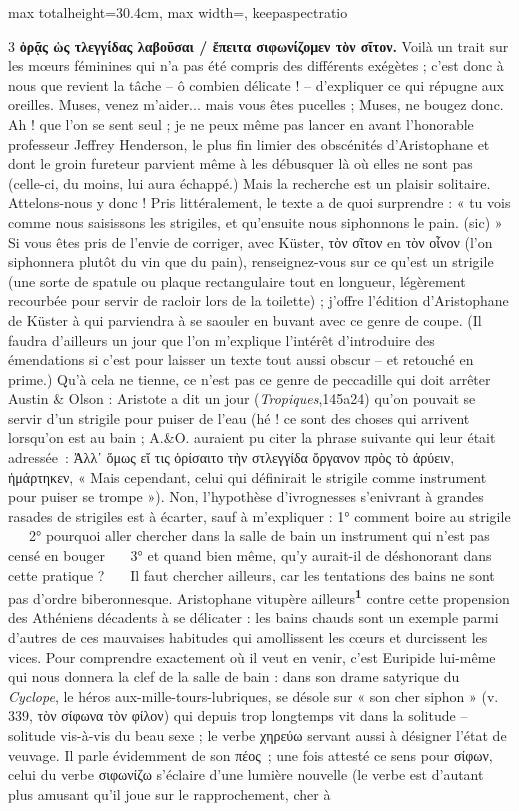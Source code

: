 \documentclass[11pt,twoside]{book}
\newcommand{\italique}[1]{\textit{#1}}
\newcommand{\marqueur}[1]{\textsuperscript{\color{rubricRed}\textbf{#1}}}
\begin{document}
\begin{adjustbox}{max totalheight=30.4cm, max width=\textwidth, keepaspectratio}
\begin{minipage}{\textwidth}
{\begin{multicols}{3}
 \textbf{ὁρᾷς ὡς τλεγγίδας λαβοῦσαι / ἔπειτα σιφωνίζομεν τὸν σῖτον.} Voilà un trait sur les mœurs féminines qui n'a pas été compris des différents exégètes ; c'est donc à nous que revient la tâche – ô combien délicate ! – d'expliquer ce qui répugne aux oreilles. Muses, venez m'aider... mais vous êtes pucelles ; Muses, ne bougez donc. Ah ! que l'on se sent seul ; je ne peux même pas lancer en avant l'honorable professeur Jeffrey Henderson, le plus fin limier des obscénités d'Aristophane et dont le groin fureteur parvient même à les débusquer là où elles ne sont pas (celle-ci, du moins, lui aura échappé.) Mais la recherche est un plaisir solitaire. Attelons-nous y donc ! Pris littéralement, le texte a de quoi surprendre : « tu vois comme nous saisissons les strigiles, et qu'ensuite nous siphonnons le pain. (sic) » Si vous êtes pris de l'envie de corriger, avec Küster, τὸν σῖτον en τὸν οἶνον (l'on siphonnera plutôt du vin que du pain), renseignez-vous sur ce qu'est un strigile (une sorte de spatule ou plaque rectangulaire tout en longueur, légèrement recourbée pour servir de racloir lors de la toilette) ; j'offre l'édition d'Aristophane de Küster à qui parviendra à se saouler en buvant avec ce genre de coupe. (Il faudra d'ailleurs un jour que l'on m'explique l'intérêt d'introduire des émendations si c'est pour laisser un texte tout aussi obscur – et retouché en prime.) Qu'à cela ne tienne, ce n'est pas ce genre de peccadille qui doit arrêter Austin \& Olson : Aristote a dit un jour (\italique{Tropiques},145a24) qu'on pouvait se servir d'un strigile pour puiser de l'eau (hé ! ce sont des choses qui arrivent lorsqu'on est au bain ; A.\&O. auraient pu citer la phrase suivante qui leur était adressée~: Ἀλλ᾽ ὅμως εἴ τις ὁρίσαιτο τὴν στλεγγίδα ὄργανον πρὸς τὸ ἀρύειν, ἡμάρτηκεν, « Mais cependant, celui qui définirait le strigile comme instrument pour puiser se trompe »). Non, l'hypothèse d'ivrognesses s'enivrant à grandes rasades de strigiles est à écarter, sauf à m'expliquer : 1° comment boire au strigile \ \ \ 2° pourquoi aller chercher dans la salle de bain un instrument qui n'est pas censé en bouger \ \ \ 3° et quand bien même, qu'y aurait-il de déshonorant dans cette pratique ? \ \ \ Il faut chercher ailleurs, car les tentations des bains ne sont pas d'ordre biberonnesque. Aristophane vitupère ailleurs\marqueur{1} contre cette propension des Athéniens décadents à se délicater : les bains chauds sont un exemple parmi d'autres de ces mauvaises habitudes qui amollissent les cœurs et durcissent les vices. Pour comprendre exactement où il veut en venir, c'est Euripide lui-même qui nous donnera la clef de la salle de bain : dans son drame satyrique du \italique{Cyclope}, le héros aux-mille-tours-lubriques, se désole sur « son cher siphon » (v. 339, τὸν σίφωνα τὸν φίλον) qui depuis trop longtemps vit dans la solitude – solitude vis-à-vis du beau sexe ; le verbe χηρεύω servant aussi à désigner l'état de veuvage. Il parle évidemment de son πέος~; une fois attesté ce sens pour σίφων, celui du verbe σιφωνίζω s'éclaire d'une lumière nouvelle (le verbe est d'autant plus amusant qu'il joue sur le rapprochement, cher à 
\end{multicols}}
\end{minipage}
\end{adjustbox}
\end{document}
